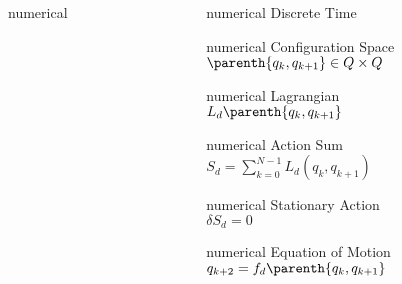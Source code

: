 \documentclass[11pt,professionalfonts]{beamer}
\begin{document}
\begin{frame}
\begin{columns}[c]
\begin{column}{0.5\textwidth}
\begin{beamercolorbox}[wd=0.8\columnwidth,sep=0.05cm,center]{numerical}
			\end{beamercolorbox}
		\end{column}
		\pause
		\begin{column}{0.5\textwidth}
			\centering
			\begin{beamercolorbox}[wd=0.8\columnwidth,sep=0.05cm,center]{numerical} Discrete Time \end{beamercolorbox}
			\begin{beamercolorbox}[wd=0.8\columnwidth,sep=0.05cm,center]{numerical} 
				Configuration Space \\
				\( \parenth{q_k, q_{k+1} } \in Q \times Q \)
			\end{beamercolorbox}
			\begin{beamercolorbox}[wd=0.8\columnwidth,sep=0.05cm,center]{numerical} 
				Lagrangian \\
				\( L_d\parenth{q_k, q_{k+1}} \)
			\end{beamercolorbox}
			\begin{beamercolorbox}[wd=0.8\columnwidth,sep=0.05cm,center]{numerical} 
				Action Sum \\
				\( S_d = \sum_{k=0}^{N-1} L_d(q_k, q_{k+1}) \)
			\end{beamercolorbox}
			\begin{beamercolorbox}[wd=0.8\columnwidth,sep=0.05cm,center]{numerical} 
				Stationary Action \\
				\( \delta S_d = 0 \)
			\end{beamercolorbox}
			\begin{beamercolorbox}[wd=0.8\columnwidth,sep=0.05cm,center]{numerical} 
				Equation of Motion \\
				\( q_{k+2} = f_d \parenth{q_k, q_{k+1} } \)
			\end{beamercolorbox}
		\end{column}
	\end{columns}
	
\end{frame}%
\end{document}
